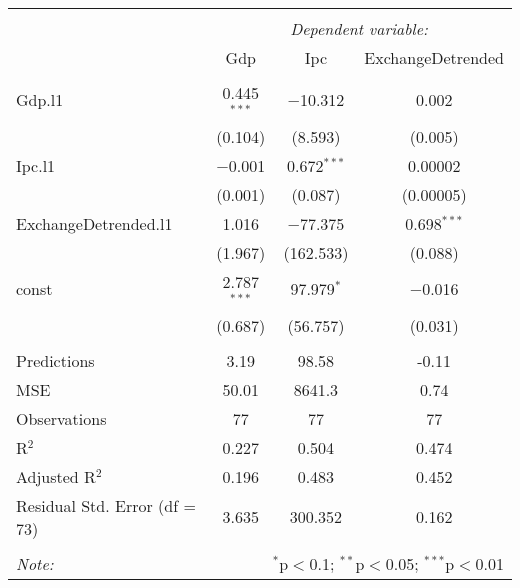 
\begin{table}[H] \centering 
  \caption{} 
  \label{} 
\begin{tabular}{@{\extracolsep{5pt}}lccc} 
\\[-1.8ex]\hline 
\hline \\[-1.8ex] 
 & \multicolumn{3}{c}{\textit{Dependent variable:}} \\ 
\cline{2-4} 
 & Gdp & Ipc & ExchangeDetrended \\ 
\hline \\[-1.8ex] 
 Gdp.l1 & 0.445$^{***}$ & $-$10.312 & 0.002 \\ 
  & (0.104) & (8.593) & (0.005) \\ 
  Ipc.l1 & $-$0.001 & 0.672$^{***}$ & 0.00002 \\ 
  & (0.001) & (0.087) & (0.00005) \\ 
  ExchangeDetrended.l1 & 1.016 & $-$77.375 & 0.698$^{***}$ \\ 
  & (1.967) & (162.533) & (0.088) \\ 
  const & 2.787$^{***}$ & 97.979$^{*}$ & $-$0.016 \\ 
  & (0.687) & (56.757) & (0.031) \\ 
 \hline \\[-1.8ex] 
Predictions & 3.19 & 98.58 & -0.11 \\ 
MSE & 50.01 & 8641.3 & 0.74 \\ 
Observations & 77 & 77 & 77 \\ 
R$^{2}$ & 0.227 & 0.504 & 0.474 \\ 
Adjusted R$^{2}$ & 0.196 & 0.483 & 0.452 \\ 
Residual Std. Error (df = 73) & 3.635 & 300.352 & 0.162 \\ 
\hline 
\hline \\[-1.8ex] 
\textit{Note:}  & \multicolumn{3}{r}{$^{*}$p$<$0.1; $^{**}$p$<$0.05; $^{***}$p$<$0.01} \\ 
\end{tabular} 
\end{table} 
